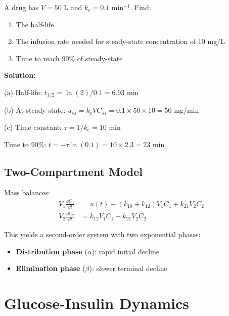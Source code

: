 \begin{examplebox}[title=Example 1.15: IV Drug Infusion]
A drug has $V = 50$ L and $k_e = 0.1$ min$^{-1}$. Find:
\begin{enumerate}[label=(\alph*)]
    \item The half-life
    \item The infusion rate needed for steady-state concentration of 10 mg/L
    \item Time to reach 90\% of steady-state
\end{enumerate}

\textbf{Solution:}

(a) Half-life: $t_{1/2} = \ln(2)/0.1 = 6.93$ min

(b) At steady-state: $u_{ss} = k_e V C_{ss} = 0.1 \times 50 \times 10 = 50$ mg/min

(c) Time constant: $\tau = 1/k_e = 10$ min

Time to 90\%: $t = -\tau\ln(0.1) = 10 \times 2.3 = 23$ min
\end{examplebox}

\subsection{Two-Compartment Model}



Mass balances:
\begin{align}
V_1\frac{\dd C_1}{\dd t} &= u(t) - (k_{10} + k_{12})V_1 C_1 + k_{21}V_2 C_2 \\
V_2\frac{\dd C_2}{\dd t} &= k_{12}V_1 C_1 - k_{21}V_2 C_2
\end{align}

This yields a second-order system with two exponential phases:
\begin{itemize}
    \item \textbf{Distribution phase} ($\alpha$): rapid initial decline
    \item \textbf{Elimination phase} ($\beta$): slower terminal decline
\end{itemize}

\section{Glucose-Insulin Dynamics}
\label{sec:glucose}

